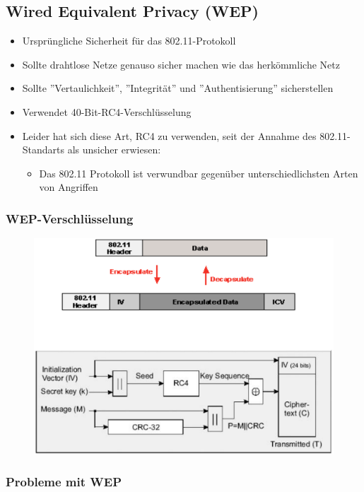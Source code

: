 \documentclass[openany]{book}
\begin{document}
\subsection{Wired Equivalent Privacy (WEP)}

\begin{itemize}
    \item Ursprüngliche Sicherheit für das 802.11-Protokoll
    \item Sollte drahtlose Netze genauso sicher machen wie das herkömmliche Netz
    \item Sollte ''Vertaulichkeit'', ''Integrität'' und ''Authentisierung'' sicherstellen
    \item Verwendet 40-Bit-RC4-Verschlüsselung
    \item Leider hat sich diese Art, RC4 zu verwenden, seit der Annahme des 802.11-Standarts als unsicher erwiesen:
    \begin{itemize}
        \item Das 802.11 Protokoll ist verwundbar gegenüber unterschiedlichsten Arten von Angriffen
    \end{itemize}
\end{itemize}

\newpage

\subsubsection{WEP-Verschlüsselung}

\begin{figure}[h!]
    \centering
    \includegraphics[width=0.85\linewidth]{Pics/WEP.PNG}
\end{figure}

\subsubsection{Probleme mit WEP}
\end{document}
